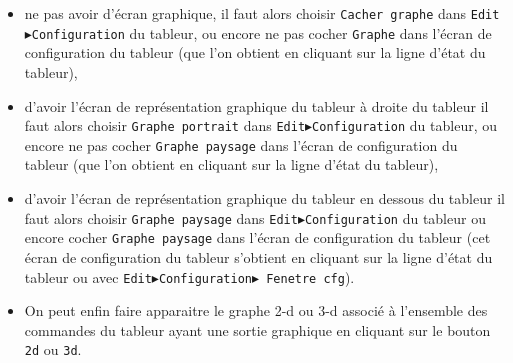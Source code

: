 \documentclass[a4paper,11pt]{article}
\begin{document}
\begin{itemize}
\item ne pas avoir d'\'ecran graphique, il faut alors choisir
{\tt Cacher graphe} dans {\tt Edit$\blacktriangleright$Configuration} du 
tableur, ou encore ne pas cocher {\tt Graphe} dans 
l'\'ecran de configuration du
tableur (que l'on obtient en cliquant sur la ligne d'\'etat du tableur),
\item d'avoir l'\'ecran de repr\'esentation graphique du tableur \`a droite du 
tableur il faut alors choisir {\tt Graphe portrait} dans 
{\tt Edit$\blacktriangleright$Configuration} du tableur, ou encore ne pas 
cocher {\tt Graphe paysage} dans l'\'ecran de configuration du tableur (que 
l'on obtient en cliquant sur la ligne d'\'etat du tableur),
\item d'avoir l'\'ecran de repr\'esentation graphique du tableur en dessous du 
tableur il faut alors choisir {\tt Graphe paysage} dans 
{\tt Edit$\blacktriangleright$Configuration} du tableur ou encore cocher
{\tt Graphe paysage} dans l'\'ecran de configuration du tableur 
(cet \'ecran de configuration du tableur s'obtient en cliquant sur la ligne 
d'\'etat du tableur ou avec 
{\tt Edit$\blacktriangleright$Configuration$\blacktriangleright$ Fenetre cfg}).
\item On peut enfin faire apparaitre le graphe 2-d ou 3-d associ\'e
\`a l'ensemble des commandes du tableur ayant une sortie graphique 
en cliquant sur le bouton {\tt 2d} ou {\tt 3d}.
\end{itemize}
\end{document}
